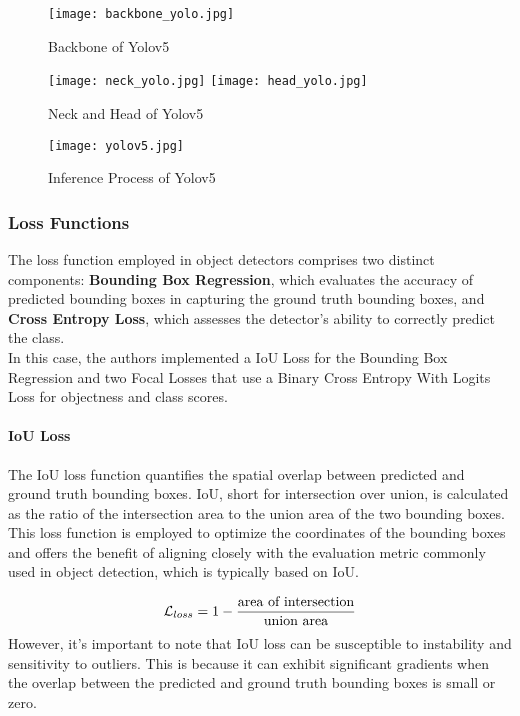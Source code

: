 \begin{figure}[h!]
   \centering
  \texttt{[image: backbone\_yolo.jpg]}
  \caption{Backbone of Yolov5}
  \label{fig:backboneyolo}
\end{figure}

\begin{figure}[h!]
  \texttt{[image: neck\_yolo.jpg]}
  \texttt{[image: head\_yolo.jpg]}
  \caption{Neck and Head of Yolov5}
  \label{fig:neckyolo}
\end{figure}

\begin{figure}[h!]
  \centering
  \texttt{[image: yolov5.jpg]}
  \caption{Inference Process of Yolov5}
  \label{fig:inferenceyolo}
\end{figure}

\newpage
\subsubsection{Loss Functions}
The loss function employed in object detectors comprises two distinct components: \textbf{Bounding Box Regression}, which evaluates the accuracy of predicted bounding boxes in capturing the ground truth bounding boxes, and \textbf{Cross Entropy Loss}, which assesses the detector's ability to correctly predict the class.\\
In this case, the authors implemented a IoU Loss for the Bounding Box Regression and two Focal Losses that use a Binary Cross Entropy With Logits Loss for objectness and class scores.

\paragraph{IoU Loss}
The IoU loss function quantifies the spatial overlap between predicted and ground truth bounding boxes. IoU, short for intersection over union, is calculated as the ratio of the intersection area to the union area of the two bounding boxes. This loss function is employed to optimize the coordinates of the bounding boxes and offers the benefit of aligning closely with the evaluation metric commonly used in object detection, which is typically based on IoU.

$$ \mathcal{L}_{loss} = 1 - {\textrm{area of intersection}\over{\textrm{union area}}}$$
However, it's important to note that IoU loss can be susceptible to instability and sensitivity to outliers. This is because it can exhibit significant gradients when the overlap between the predicted and ground truth bounding boxes is small or zero.

